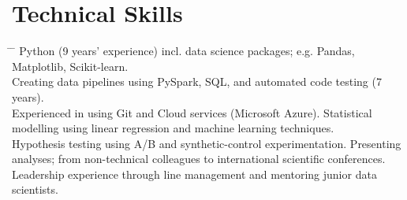 \documentclass[10pt]{article} %
\begin{document}
\section{Technical Skills}
\begin{tabbing}
  \hspace{3mm} \= \hspace{30mm} \= \kill
        {
          Python (9 years' experience) incl. data science packages; e.g. Pandas, Matplotlib, Scikit-learn. \\
          \>\>Creating data pipelines using PySpark, SQL, and automated code testing (7 years). \\
          \>\>Experienced in using Git and Cloud services (Microsoft Azure).
        }
        {
          Statistical modelling using linear regression and machine learning techniques. \\
          \>\>Hypothesis testing using A/B and synthetic-control experimentation.
        }
        {
          Presenting analyses; from non-technical colleagues to international scientific conferences. \\
          \>\>Leadership experience through line management and mentoring junior data scientists.
        }
\end{tabbing}

\vspace{-9mm}
\end{document}
